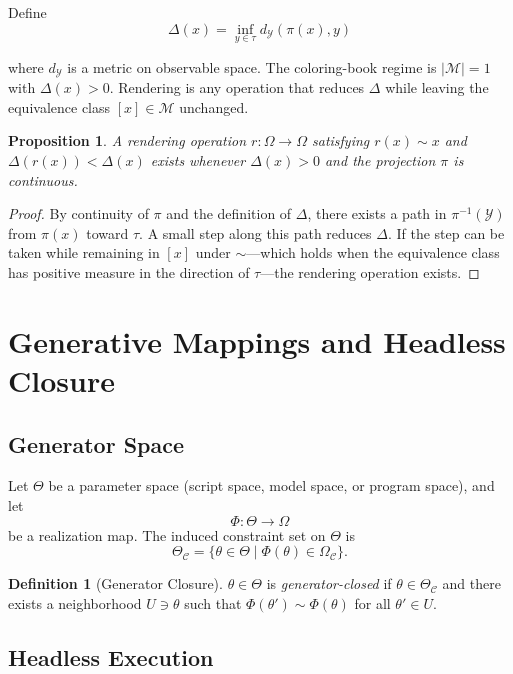 \documentclass[11pt, twoside]{article}
\theoremstyle{plain}
\newtheorem{proposition}[theorem]{Proposition}
\theoremstyle{definition}
\newtheorem{definition}[theorem]{Definition}
\theoremstyle{remark}
\newcommand{\OmC}{\Omega_{\mathcal{C}}}
\begin{document}
Define
\[
\Delta(x) = \inf_{y \in \tau} d_{\mathcal{Y}}(\pi(x), y)
\]

where $d_{\mathcal{Y}}$ is a metric on observable space. The coloring-book regime is $|\mathcal{M}| = 1$ with $\Delta(x) > 0$. Rendering is any operation that reduces $\Delta$ while leaving the equivalence class $[x] \in \mathcal{M}$ unchanged.

\begin{proposition}
A rendering operation $r : \Omega \to \Omega$ satisfying $r(x) \sim x$ and $\Delta(r(x)) < \Delta(x)$ exists whenever $\Delta(x) > 0$ and the projection $\pi$ is continuous.
\end{proposition}

\begin{proof}
By continuity of $\pi$ and the definition of $\Delta$, there exists a path in $\pi^{-1}(\mathcal{Y})$ from $\pi(x)$ toward $\tau$. A small step along this path reduces $\Delta$. If the step can be taken while remaining in $[x]$ under $\sim$---which holds when the equivalence class has positive measure in the direction of $\tau$---the rendering operation exists.
\end{proof}

\section{Generative Mappings and Headless Closure}
\label{app:generator}

\subsection{Generator Space}

Let $\Theta$ be a parameter space (script space, model space, or program space), and let
\[
\Phi : \Theta \to \Omega
\]
be a realization map. The induced constraint set on $\Theta$ is
\[
\Theta_{\mathcal{C}} = \{ \theta \in \Theta \mid \Phi(\theta) \in \OmC \}.
\]

\begin{definition}[Generator Closure]
$\theta \in \Theta$ is \emph{generator-closed} if $\theta \in \Theta_{\mathcal{C}}$ and there exists a neighborhood $U \ni \theta$ such that $\Phi(\theta') \sim \Phi(\theta)$ for all $\theta' \in U$.
\end{definition}

\subsection{Headless Execution}
\end{document}
